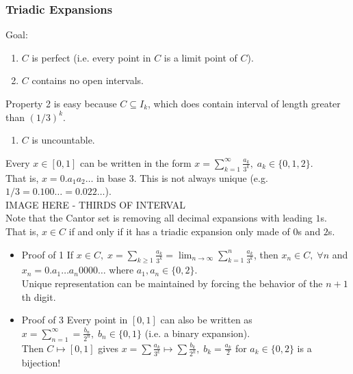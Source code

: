 \documentclass[11pt]{article}
\newcommand{\0}{\emptyset}
\begin{document}
\subsubsection*{Triadic Expansions}
\label{sec:orgfb7226e}
Goal:\\[0pt]
\begin{enumerate}
\item \(C\) is perfect (i.e. every point in \(C\) is a limit point of \(C\)).\\[0pt]
\item \(C\) contains no open intervals.\\[0pt]
\end{enumerate}
Property 2 is easy because \(C\subseteq I_{k}\), which does contain interval of length greater than \((1/3)^{k}\).\\[0pt]
\begin{enumerate}
\item \(C\) is uncountable.\\[0pt]
\end{enumerate}
Every \(x\in[0,1]\) can be written in the form \(x=\sum_{k=1}^{\infty}\frac{a_{k}}{3^{k}},\;a_{k}\in\{0,1,2\}\).\\[0pt]
That is, \(x=0.a_{1}a_{2}\ldots\) in base \(3\). This is not always unique (e.g. \(1/3=0.100\ldots=0.022\ldots\)).\\[0pt]
IMAGE HERE - THIRDS OF INTERVAL\\[0pt]
Note that the Cantor set is removing all decimal expansions with leading \(1\)s. That is, \(x\in C\) if and only if it has a triadic expansion only made of \(0\)s and \(2\)s.\\[0pt]
\begin{itemize}
\item Proof of 1
\label{sec:org83781bf}
If \(x\in C,\;x=\sum_{k\geq 1}\frac{a_{k}}{3^{k}}=\lim_{n\to\infty}\sum_{k=1}^{n}\frac{a_{k}}{3^{k}}\), then \(x_{n}\in C,\;\forall n\) and \(x_{n}=0.a_{1}\ldots a_{n}0000\ldots\) where \(a_{1},a_{n}\in\{0,2\}\).\\[0pt]
Unique representation can be maintained by forcing the behavior of the \(n+1\)th digit.\\[0pt]
\item Proof of 3
\label{sec:orgd25aa2f}
Every point in \([0,1]\) can also be written as \(x=\sum_{n=1}^{\infty}=\frac{b_{n}}{2^{n}},\;b_{n}\in\{0,1\}\) (i.e. a binary expansion).\\[0pt]
Then \(C\mapsto[0,1]\) gives \(x=\sum\frac{a_{k}}{3^{k}}\mapsto\sum\frac{b_{k}}{2^{k}},\;b_{k}=\frac{a_{k}}{2}\) for \(a_{k}\in\{0,2\}\) is a bijection!\\[0pt]
\end{itemize}
\end{document}
